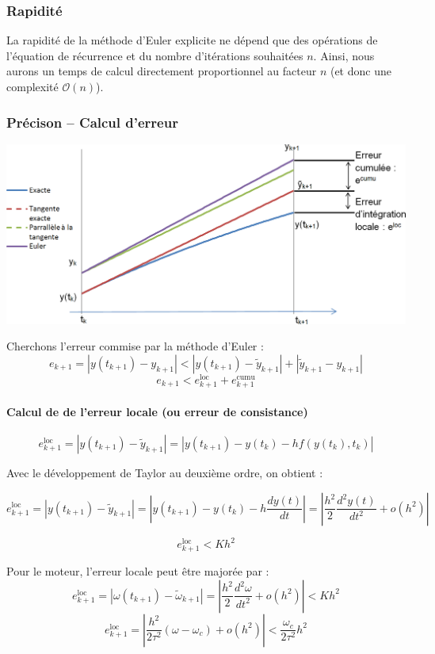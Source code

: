 \documentclass[10pt]{article}
\begin{document}
\subsubsection{Rapidité}
La rapidité de la méthode d’Euler explicite ne dépend que des opérations de l’équation de récurrence et du nombre d’itérations souhaitées $n$. Ainsi, nous aurons un temps de calcul directement proportionnel au facteur $n$ (et donc une complexité $\mathcal{O}(n)$).
\subsubsection{Précison -- Calcul d'erreur}

\begin{center}
\includegraphics[width=.8\textwidth]{images/fig_06}
\end{center}

Cherchons l’erreur commise par la méthode d’Euler :
$$e_{k+1}=|y(t_{k+1} )-y_{k+1} |<|y(t_{k+1} )-\tilde{y}_{k+1} |+|\tilde{y}_{k+1}-y_{k+1} |$$
$$e_{k+1}<e_{k+1}^{\text{loc}}+e_{k+1}^{\text{cumu}}$$

\paragraph{Calcul de de l’erreur locale (ou erreur de consistance)}
$$e_{k+1}^{\text{loc}}=|y(t_{k+1} )-\tilde{y}_{k+1} |=|y(t_{k+1} )-y(t_k )-hf(y(t_k ),t_k ) |$$

Avec le développement de Taylor au deuxième ordre, on obtient :

$$e_{k+1}^{\text{loc}}=|y(t_{k+1} )-\tilde{y}_{k+1} |=\left|y(t_{k+1} )-y(t_k )-h \dfrac{dy(t)}{dt}\right|=\left|\dfrac{h^2}{2}  \dfrac{d^2y(t)}{dt^2} +o(h^2 ) \right|$$


$$
e_{k+1}^{\text{loc}}<Kh^2
$$

Pour le moteur, l’erreur locale peut être majorée par :
$$e_{k+1}^{\text{loc}}=|\omega(t_{k+1} )-\tilde{\omega}_{k+1} |=\left|\dfrac{h^2}{2}  \dfrac{d^2 \omega}{dt^2}+o(h^2 ) \right|<Kh^2$$
$$e_{k+1}^{\text{loc}}=\left| \dfrac{h^2}{2\tau^2 } (\omega-\omega_c)+o(h^2 ) \right|<\dfrac{\omega_c}{2\tau^2 } h^2$$
\end{document}
